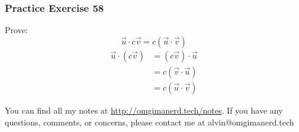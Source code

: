 \documentclass{math}
\begin{document}
\subsubsection*{Practice Exercise 58}
Prove:
\[ \vec{u}\cdot c\vec{v} = c(\vec{u}\cdot\vec{v}) \]
\begin{align*}
  \vec{u}\cdot(c\vec{v}) &= (c\vec{v})\cdot\vec{u} \\
  &= c(\vec{v}\cdot\vec{u}) \\
  &= c(\vec{u}\cdot\vec{v})
\end{align*}

\begin{center}
  You can find all my notes at \url{http://omgimanerd.tech/notes}. If you have
  any questions, comments, or concerns, please contact me at
  alvin@omgimanerd.tech
\end{center}
\end{document}
